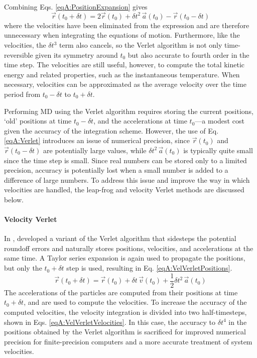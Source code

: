 Combining Eqs. \ref{eqA:PositionExpansion} gives
\begin{equation}
   \vec{r}(t_0 + \delta t) = 2 \vec{r}(t_0) + \delta t^2 \, \vec{a}(t_0) -
         \vec{r}(t_0 - \delta t)
   \label{eqA:Verlet}
\end{equation}
where the velocities have been eliminated from the expression and are therefore
unnecessary when integrating the equations of motion. Furthermore, like the
velocities, the $\delta t^3$ term also cancels, so the Verlet algorithm is not
only time-reversible given its symmetry around $t_0$ but also accurate to fourth
order in the time step. The velocities are still useful, however, to compute the
total kinetic energy and related properties, such as the instantaneous
temperature. When necessary, velocities can be approximated as the average
velocity over the time period from $t_0-\delta t$ to $t_0+\delta t$.

Performing MD using the Verlet algorithm requires storing the current positions,
`old' positions at time $t_0-\delta t$, and the accelerations at time $t_0$---a
modest cost given the accuracy of the integration scheme. However, the use of
Eq. \ref{eqA:Verlet} introduces an issue of numerical precision, since
$\vec{r}(t_0)$ and $\vec{r}(t_0 - \delta t)$ are potentially large values, while
$\delta t^2 \, \vec{a}(t_0)$ is typically quite small since the time step is
small. Since real numbers can be stored only to a limited precision, accuracy is
potentially lost when a small number is added to a difference of large numbers.
\cite{Allen_Tildesley} To address this issue and improve the way in which
velocities are handled, the leap-frog and velocity Verlet methods are discussed
below.

\paragraph{Velocity Verlet}

In \citeyear{Swope_JChemPhys_1982_v76_p637},
\citeauthor{Swope_JChemPhys_1982_v76_p637} developed a variant of the Verlet
algorithm that sidesteps the potential roundoff errors and naturally stores
positions, velocities, and accelerations at the same time. A Taylor series
expansion is again used to propagate the positions, but only the $t_0+\delta t$
step is used, resulting in Eq. \ref{eqA:VelVerletPositions}.
\begin{equation}
   \vec{r}(t_0 + \delta t) = \vec{r}(t_0) + \delta t \, \vec{v}(t_0) + \frac 1 2
         \delta t^2 \, \vec{a}(t_0)
   \label{eqA:VelVerletPositions}
\end{equation}
The accelerations of the particles are computed from their positions at time
$t_0 + \delta t$, and are used to compute the velocities. To increase the
accuracy of the computed velocities, the velocity integration is divided into
two half-timesteps, shown in Eqs. \ref{eqA:VelVerletVelocities}. In this case,
the accuracy to $\delta t^4$ in the positions obtained by the Verlet algorithm
is sacrificed for improved numerical precision for finite-precision computers
and a more accurate treatment of system velocities.


